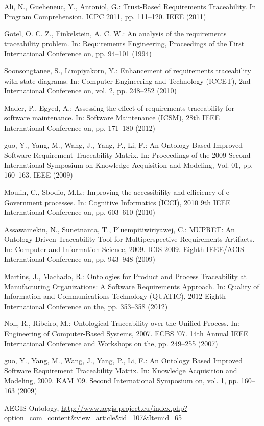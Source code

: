 \documentclass[runningheads,a4paper]{llncs}
\begin{document}
\begin{thebibliography}{4}
 Ali, N., Gueheneuc, Y., Antoniol, G.: Trust-Based Requirements Traceability.
In Program Comprehension. ICPC 2011, pp. 111--120. IEEE (2011)

 Gotel, O. C. Z., Finkelstein, A. C. W.: An analysis of the requirements traceability
problem. In: Requirements Engineering, Proceedings of the First International
Conference on, pp. 94--101 (1994)

 Soonsongtanee, S., Limpiyakorn, Y.: Enhancement of requirements traceability
with state diagrams. In: Computer Engineering and Technology (ICCET), 2nd International Conference on, vol. 2, pp. 248--252 (2010)

 Mader, P., Egyed, A.: Assessing the effect of requirements traceability for software
maintenance. In: Software Maintenance (ICSM), 28th IEEE International Conference on, pp. 171--180 (2012)

 guo, Y., Yang, M., Wang, J., Yang, P., Li, F.: An Ontology
Based Improved Software Requirement Traceability Matrix. In: Proceedings of the
2009 Second International Symposium on Knowledge Acquisition and Modeling,
Vol. 01, pp. 160--163. IEEE (2009)

 Moulin, C., Sbodio, M.L.: Improving the accessibility and
efficiency of e-Government processes. In: Cognitive Informatics (ICCI), 2010 9th
IEEE International Conference on, pp. 603--610 (2010)

 Assawamekin, N., Sunetnanta, T., Pluempitiwiriyawej, C.: MUPRET: An
Ontology-Driven Traceability Tool for Multiperspective Requirements Artifacts.
In: Computer and Information Science, 2009. ICIS 2009. Eighth IEEE/ACIS
International Conference on, pp. 943--948 (2009)

 Martins, J., Machado, R.: Ontologies for Product and Process
Traceability at Manufacturing Organizations: A Software Requirements Approach.
In: Quality of Information and Communications Technology (QUATIC), 2012 Eighth
International Conference on the, pp. 353--358 (2012)

 Noll, R., Ribeiro, M.: Ontological Traceability over
the Unified Process. In: Engineering of Computer-Based Systems, 2007. ECBS '07.
14th Annual IEEE International Conference and Workshops on the, pp.
249--255 (2007)

 guo, Y., Yang, M., Wang, J., Yang, P., Li, F.: An Ontology Based Improved
Software Requirement Traceability Matrix. In: Knowledge Acquisition and
Modeling, 2009. KAM '09. Second International Symposium on, vol. 1, pp.
160--163 (2009)

 AEGIS Ontology, \url{http://www.aegis-project.eu/index.php?option=com_content&view=article&id=107&Itemid=65}


\end{thebibliography}
\end{document}
